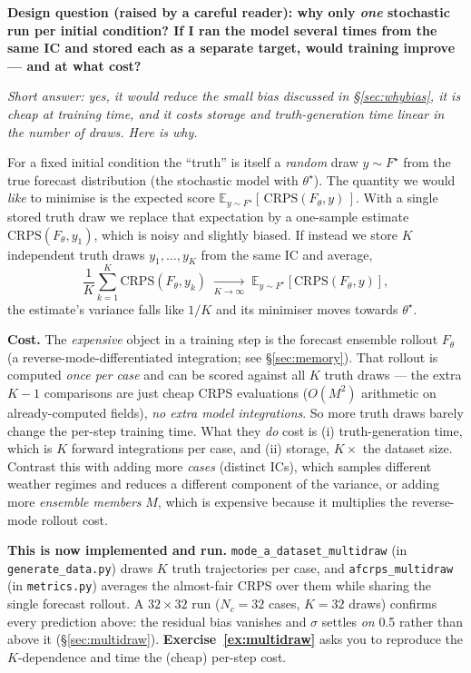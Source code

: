 \documentclass[11pt]{article}
\newcommand{\E}{\mathbb{E}}
\newcommand{\code}[1]{\texttt{#1}}
\begin{document}
\begin{qbox}
\textbf{Design question (raised by a careful reader): why only \emph{one}
stochastic run per initial condition? If I ran the model several times from the
same IC and stored each as a separate target, would training improve --- and at
what cost?}

\smallskip\noindent
\emph{Short answer: yes, it would reduce the small bias discussed in
\S\ref{sec:whybias}, it is cheap at training time, and it costs storage and
truth-generation time linear in the number of draws. Here is why.}

\smallskip\noindent
For a fixed initial condition the ``truth'' is itself a \emph{random} draw
$y\sim F^\star$ from the true forecast distribution (the stochastic model with
$\theta^\star$). The quantity we would \emph{like} to minimise is the expected
score $\E_{y\sim F^\star}[\,\mathrm{CRPS}(F_\theta, y)\,]$. With a single stored
truth draw we replace that expectation by a one-sample estimate
$\mathrm{CRPS}(F_\theta, y_1)$, which is noisy and slightly biased. If instead we
store $K$ independent truth draws $y_1,\dots,y_K$ from the same IC and average,
\begin{equation}
  \frac{1}{K}\sum_{k=1}^{K}\mathrm{CRPS}(F_\theta, y_k)
  \;\xrightarrow[K\to\infty]{}\;
  \E_{y\sim F^\star}[\mathrm{CRPS}(F_\theta, y)],
\end{equation}
the estimate's variance falls like $1/K$ and its minimiser moves towards
$\theta^\star$.

\smallskip\noindent
\textbf{Cost.} The \emph{expensive} object in a training step is the forecast
ensemble rollout $F_\theta$ (a reverse-mode-differentiated integration; see
\S\ref{sec:memory}). That rollout is computed \emph{once per case} and can be
scored against all $K$ truth draws --- the extra $K-1$ comparisons are just
cheap CRPS evaluations ($O(M^2)$ arithmetic on already-computed fields), \emph{no
extra model integrations}. So more truth draws barely change the per-step
training time. What they \emph{do} cost is (i) truth-generation time, which is $K$
forward integrations per case, and (ii) storage, $K\times$ the dataset size.
Contrast this with adding more \emph{cases} (distinct ICs), which samples
different weather regimes and reduces a different component of the variance, or
adding more \emph{ensemble members} $M$, which is expensive because it multiplies
the reverse-mode rollout cost.

\smallskip\noindent
\textbf{This is now implemented and run.} \code{mode\_a\_dataset\_multidraw}
(in \code{generate\_data.py}) draws $K$ truth trajectories per case, and
\code{afcrps\_multidraw} (in \code{metrics.py}) averages the almost-fair CRPS over
them while sharing the single forecast rollout. A $32\times32$ run
($N_c{=}32$ cases, $K{=}32$ draws) confirms every prediction above: the residual
bias vanishes and $\sigma$ settles \emph{on} 0.5 rather than above it
(\S\ref{sec:multidraw}). \textbf{Exercise~\ref{ex:multidraw}} asks you to
reproduce the $K$-dependence and time the (cheap) per-step cost.
\end{qbox}
\end{document}
